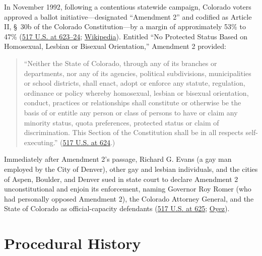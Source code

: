 \documentclass[12pt]{article}
\begin{document}
In November 1992, following a contentious statewide campaign, Colorado voters approved a ballot initiative---designated ``Amendment 2'' and codified as Article II, \S~30b of the Colorado Constitution---by a margin of approximately 53\% to 47\% (\href{https://supreme.justia.com/cases/federal/us/517/620/}{517 U.S. at 623--24}; \href{https://en.wikipedia.org/wiki/Romer_v._Evans}{Wikipedia}). Entitled ``No Protected Status Based on Homosexual, Lesbian or Bisexual Orientation,'' Amendment 2 provided:
\begin{quote}
``Neither the State of Colorado, through any of its branches or departments, nor any of its agencies, political subdivisions, municipalities or school districts, shall enact, adopt or enforce any statute, regulation, ordinance or policy whereby homosexual, lesbian or bisexual orientation, conduct, practices or relationships shall constitute or otherwise be the basis of or entitle any person or class of persons to have or claim any minority status, quota preferences, protected status or claim of discrimination. This Section of the Constitution shall be in all respects self-executing.'' (\href{https://supreme.justia.com/cases/federal/us/517/620/}{517 U.S. at 624}.)
\end{quote}

Immediately after Amendment 2's passage, Richard G. Evans (a gay man employed by the City of Denver), other gay and lesbian individuals, and the cities of Aspen, Boulder, and Denver sued in state court to declare Amendment 2 unconstitutional and enjoin its enforcement, naming Governor Roy Romer (who had personally opposed Amendment 2), the Colorado Attorney General, and the State of Colorado as official-capacity defendants (\href{https://supreme.justia.com/cases/federal/us/517/620/}{517 U.S. at 625}; \href{https://www.oyez.org/cases/1995/94-1039}{Oyez}).

\section{Procedural History}
\end{document}
